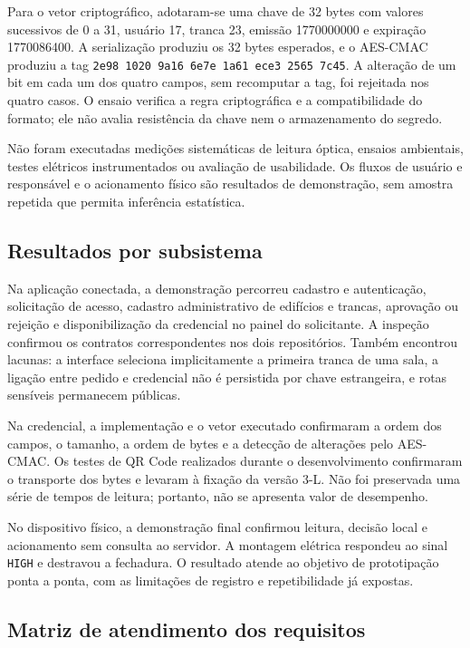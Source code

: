 Para o vetor criptográfico, adotaram-se uma chave de 32 bytes com valores sucessivos de 0 a 31, usuário 17, tranca 23, emissão 1770000000 e expiração 1770086400. A serialização produziu os 32 bytes esperados, e o AES-CMAC produziu a tag \texttt{2e98 1020 9a16 6e7e 1a61 ece3 2565 7c45}. A alteração de um bit em cada um dos quatro campos, sem recomputar a tag, foi rejeitada nos quatro casos. O ensaio verifica a regra criptográfica e a compatibilidade do formato; ele não avalia resistência da chave nem o armazenamento do segredo.

Não foram executadas medições sistemáticas de leitura óptica, ensaios ambientais, testes elétricos instrumentados ou avaliação de usabilidade. Os fluxos de usuário e responsável e o acionamento físico são resultados de demonstração, sem amostra repetida que permita inferência estatística.

\subsection{Resultados por subsistema}

Na aplicação conectada, a demonstração percorreu cadastro e autenticação, solicitação de acesso, cadastro administrativo de edifícios e trancas, aprovação ou rejeição e disponibilização da credencial no painel do solicitante. A inspeção confirmou os contratos correspondentes nos dois repositórios. Também encontrou lacunas: a interface seleciona implicitamente a primeira tranca de uma sala, a ligação entre pedido e credencial não é persistida por chave estrangeira, e rotas sensíveis permanecem públicas.

Na credencial, a implementação e o vetor executado confirmaram a ordem dos campos, o tamanho, a ordem de bytes e a detecção de alterações pelo AES-CMAC. Os testes de QR Code realizados durante o desenvolvimento confirmaram o transporte dos bytes e levaram à fixação da versão 3-L. Não foi preservada uma série de tempos de leitura; portanto, não se apresenta valor de desempenho.

No dispositivo físico, a demonstração final confirmou leitura, decisão local e acionamento sem consulta ao servidor. A montagem elétrica respondeu ao sinal \texttt{HIGH} e destravou a fechadura. O resultado atende ao objetivo de prototipação ponta a ponta, com as limitações de registro e repetibilidade já expostas.

\subsection{Matriz de atendimento dos requisitos}

